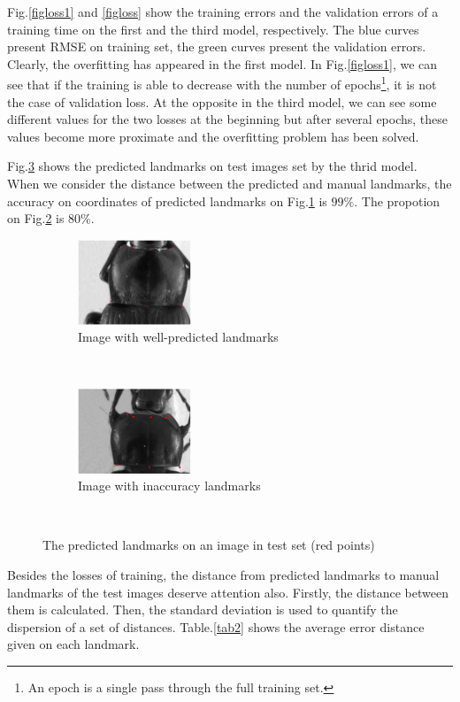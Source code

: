 \documentclass[conference]{IEEEtran}
\begin{document}
Fig.\ref{figloss1} and \ref{figloss} show the training errors and the validation errors of a training time on the first and the third model, respectively. The blue curves present RMSE on training set, the green curves present the validation errors. Clearly, the overfitting has appeared in the first model. In Fig.\ref{figloss1}, we can see that if the training is able to decrease with the number of epochs\footnote{An epoch is a single pass through the full training set.}, it is not the case of validation loss. At the opposite in the third model, we can see some different values for the two losses at the beginning but after several epochs, these values become more proximate and the overfitting problem has been solved.

Fig.\ref{figrsexample} shows the predicted landmarks on test images set by the thrid model. When we consider the distance between the predicted and manual landmarks, the accuracy on coordinates of predicted landmarks on Fig.\ref{figsub1} is $99\%$. The propotion on Fig.\ref{figsub2} is $80\%$.
\begin{figure}[h]
    \centering
    \begin{subfigure}[t]{0.25\textwidth}
        \centering
        \includegraphics[height=1.0in]{images/plandmark.eps}
        \caption{Image with well-predicted landmarks}
        \label{figsub1}
    \end{subfigure}%
    ~ 
    \begin{subfigure}[t]{0.25\textwidth}
        \centering
        \includegraphics[height=1.0in]{images/plandmark2.eps}
        \caption{Image with inaccuracy landmarks}
        \label{figsub2}
    \end{subfigure}
    \caption{The predicted landmarks on an image in test set (red points)}\
    \label{figrsexample}
\end{figure}
Besides the losses of training, the distance from predicted landmarks to manual landmarks of the test images deserve attention also. Firstly, the distance between them is calculated. Then, the standard deviation \cite{bland1996statistics} is used to quantify the dispersion of a set of distances. Table.\ref{tab2} shows the average error distance given on each landmark.
\end{document}
